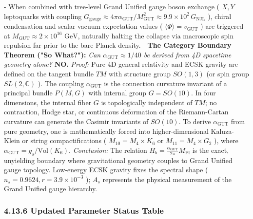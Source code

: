 \documentclass[11pt,a4paper]{article}
\theoremstyle{definition}\newtheorem{definition}{Definition}
\theoremstyle{remark}\newtheorem{remark}{Remark}
\begin{document}
- When combined with tree-level Grand Unified gauge boson exchange ( $X, Y$ leptoquarks with coupling $G_{\text{gauge}} \approx 4\pi \alpha_{\text{GUT}} / M_{\text{GUT}}^2 \approx 9.9 \times 10^2 \, G_{\text{NJL}}$ ), chiral condensation and scalar vacuum expectation values ( $\langle \Phi \rangle = v_{\text{GUT}}$ ) are triggered at $M_{\text{GUT}} \approx 2 \times 10^{16}\text{ GeV}$, naturally halting the collapse via macroscopic spin repulsion far prior to the bare Planck density.
- \textbf{The Category Boundary Theorem ("So What?"):}
\textit{Can $\alpha_{\text{GUT}} \approx 1/40$ be derived from 4D spacetime geometry alone?} \textbf{NO.}
\textit{Proof:} Pure 4D general relativity and ECSK gravity are defined on the tangent bundle $TM$ with structure group $SO(1,3)$ (or spin group $SL(2,\mathbb{C})$ ). The coupling $\alpha_{\text{GUT}}$ is the connection curvature invariant of a principal bundle $P(M, G)$ with internal group $G = SO(10)$. In four dimensions, the internal fiber $G$ is topologically independent of $TM$; no contraction, Hodge star, or continuous deformation of the Riemann-Cartan curvature can generate the Casimir invariants of $SO(10)$.
To derive $\alpha_{\text{GUT}}$ from pure geometry, one is mathematically forced into higher-dimensional Kaluza-Klein or string compactifications ( $M_{10} = M_4 \times K_6$ or $M_{11} = M_4 \times G_2$ ), where $\alpha_{\text{GUT}} = g_s / \mathrm{Vol}(K_6)$.
\textit{Conclusion:} The relation $H_b = \frac{\alpha_{\text{GUT}}}{2\pi} M_{\text{Pl}}$ is the exact, unyielding boundary where gravitational geometry couples to Grand Unified gauge topology. Low-energy ECSK gravity fixes the spectral shape ( $n_s = 0.9624, r = 3.9 \times 10^{-3}$ ); $A_s$ represents the physical measurement of the Grand Unified gauge hierarchy.
\subsubsection{4.13.6 Updated Parameter Status Table}
\end{document}
